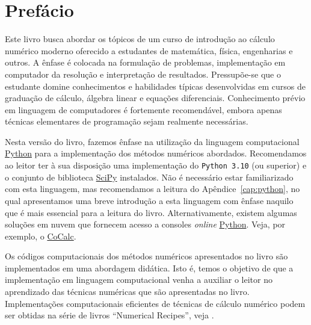 
\chapter*{Prefácio}

Este livro busca abordar os tópicos de um curso de introdução ao cálculo numérico moderno oferecido a estudantes de matemática, física, engenharias e outros. A ênfase é colocada na formulação de problemas, implementação em computador da resolução e interpretação de resultados. Pressupõe-se que o estudante domine conhecimentos e habilidades típicas desenvolvidas em cursos de graduação de cálculo, álgebra linear e equações diferenciais. Conhecimento prévio em linguagem de computadores é fortemente recomendável, embora apenas técnicas elementares de programação sejam realmente necessárias.

Nesta versão do livro, fazemos ênfase na utilização da linguagem computacional \href{https://www.python.org/}{Python} para a implementação dos métodos numéricos abordados. Recomendamos ao leitor ter à sua disposição uma implementação do \verb+Python 3.10+ (ou superior) e o conjunto de biblioteca \href{https://www.scipy.org/}{SciPy} instalados. Não é necessário estar familiarizado com esta linguagem, mas recomendamos a leitura do Apêndice~\ref{cap:python}, no qual apresentamos uma breve introdução a esta linguagem com ênfase naquilo que é mais essencial para a leitura do livro. Alternativamente, existem algumas soluções em nuvem que fornecem acesso a consoles {\it online} \href{https://www.python.org/}{Python}. Veja, por exemplo, o \href{https://cocalc.com}{CoCalc}.

Os códigos computacionais dos métodos numéricos apresentados no livro são implementados em uma abordagem didática. Isto é, temos o objetivo de que a implementação em linguagem computacional venha a auxiliar o leitor no aprendizado das técnicas numéricas que são apresentadas no livro. Implementações computacionais eficientes de técnicas de cálculo numérico podem ser obtidas na série de livros ``Numerical Recipes'', veja \cite{numerical}.

